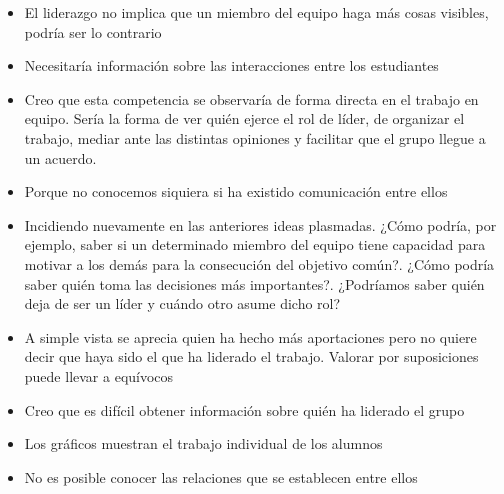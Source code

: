 \begin{itemize}
\item El liderazgo no implica que un miembro del equipo haga más cosas visibles, podría ser lo contrario
\item Necesitaría información sobre las interacciones entre los estudiantes
\item Creo que esta competencia se observaría de forma directa en el trabajo en equipo. Sería la forma de ver quién ejerce el rol de líder, de organizar el trabajo, mediar ante las distintas opiniones y facilitar que el grupo llegue a un acuerdo.
\item Porque no conocemos siquiera si ha existido comunicación entre ellos
\item Incidiendo nuevamente en las anteriores ideas plasmadas. ¿Cómo podría, por ejemplo, saber si un determinado miembro del equipo tiene capacidad para motivar a los demás para la consecución del objetivo común?. ¿Cómo podría saber quién toma las decisiones más importantes?. ¿Podríamos saber quién deja de ser un líder y cuándo otro asume dicho rol?
\item A simple vista se aprecia quien ha hecho más aportaciones pero no quiere decir que haya sido el que ha liderado el trabajo. Valorar por suposiciones puede llevar a equívocos
\item Creo que es difícil obtener información sobre quién ha liderado el grupo
\item Los gráficos muestran el trabajo individual de los alumnos
\item No es posible conocer las relaciones que se establecen entre ellos
\end{itemize}
